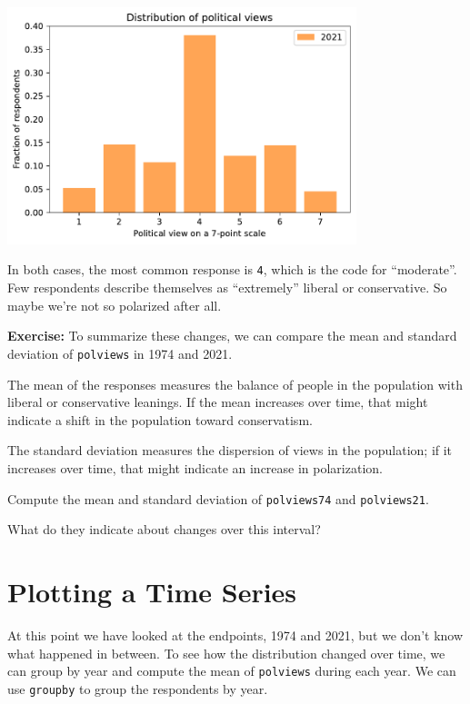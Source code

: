 \begin{center}
\includegraphics[width=4in]{chapters/02_polviews_soln_files/02_polviews_soln_34_0.pdf}
\end{center}

In both cases, the most common response is \passthrough{\lstinline!4!},
which is the code for ``moderate''. Few respondents describe themselves
as ``extremely'' liberal or conservative. So maybe we're not so
polarized after all.

\textbf{Exercise:} To summarize these changes, we can compare the mean
and standard deviation of \passthrough{\lstinline!polviews!} in 1974 and
2021.

The mean of the responses measures the balance of people in the
population with liberal or conservative leanings. If the mean increases
over time, that might indicate a shift in the population toward
conservatism.

The standard deviation measures the dispersion of views in the
population; if it increases over time, that might indicate an increase
in polarization.

Compute the mean and standard deviation of
\passthrough{\lstinline!polviews74!} and
\passthrough{\lstinline!polviews21!}.

What do they indicate about changes over this interval?

\hypertarget{plotting-a-time-series}{%
\section{Plotting a Time Series}\label{plotting-a-time-series}}

At this point we have looked at the endpoints, 1974 and 2021, but we
don't know what happened in between. To see how the distribution changed
over time, we can group by year and compute the mean of
\passthrough{\lstinline!polviews!} during each year. We can use
\passthrough{\lstinline!groupby!} to group the respondents by year.

